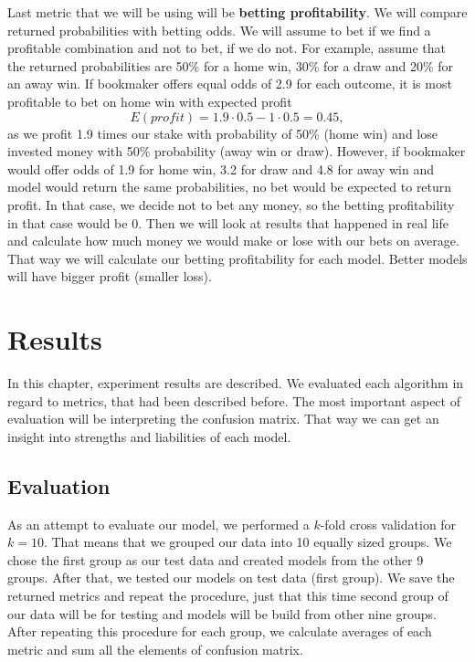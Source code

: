 \documentclass[conference]{IEEEtran}
\begin{document}
Last metric that we will be using will be \textbf{betting profitability}. We will 
compare returned probabilities with betting odds. We will assume to bet if we find a 
profitable combination and not to bet, if we do not. For example, assume that the returned 
probabilities are 50\% for a home win, 30\% for a draw and 20\% for an away win. If bookmaker 
offers equal odds of 2.9 for each outcome, it is most profitable to bet on home win with 
expected profit $$E(profit) = 1.9 \cdot 0.5 - 1 \cdot 0.5 = 0.45, $$
as we profit 1.9 times our stake with probability of 50\% (home win) and lose invested money
with 50\% probability (away win or draw). However, if bookmaker would offer odds of 1.9 for
home win, 3.2 for draw and 4.8 for away win and model would return the same probabilities, no
bet would be expected to return profit. In that case, we decide not to bet any money, so the
betting profitability in that case would be 0. Then we will look at results that happened 
in real life and calculate how much money we would make or lose with our bets on average. That way 
we will calculate our betting profitability for each model. Better models will have bigger profit 
(smaller loss).

\section{Results}

In this chapter, experiment results are described. We evaluated each algorithm
in regard to metrics, that had been described before. The most important aspect of evaluation
will be interpreting the confusion matrix. That way we can get an insight into strengths 
and liabilities of each model.

\subsection{Evaluation}

As an attempt to evaluate our model, we performed a $k$-fold cross validation
for $k=10$. That means that we grouped our data into 10 equally sized groups. We 
chose the first group as our test data and created models from the other 9 
groups. After that, we tested our models on test data (first group). We save the
returned metrics and repeat the procedure, just that this time second group of our data 
will be for testing and models will be build from other nine groups. After repeating this
procedure for each group, we calculate averages of each metric and sum all the elements
of confusion matrix. 
\end{document}
